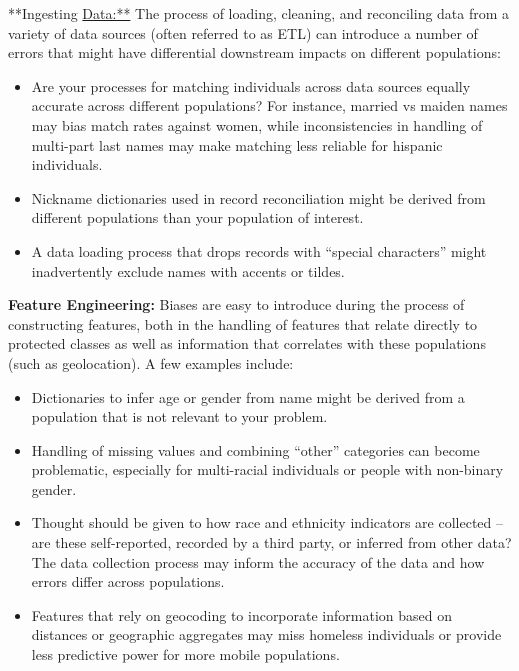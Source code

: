 \documentclass[]{krantz}
\begin{document}
**Ingesting \url{Data:**} The process of loading, cleaning, and
reconciling data from a variety of data sources (often referred to as
ETL) can introduce a number of errors that might have differential
downstream impacts on different populations:

\begin{itemize}
\item
  Are your processes for matching individuals across data sources
  equally accurate across different populations? For instance, married
  vs maiden names may bias match rates against women, while
  inconsistencies in handling of multi-part last names may make matching
  less reliable for hispanic individuals.
\item
  Nickname dictionaries used in record reconciliation might be derived
  from different populations than your population of interest.
\item
  A data loading process that drops records with ``special characters''
  might inadvertently exclude names with accents or tildes.
\end{itemize}

\textbf{Feature Engineering:} Biases are easy to introduce during the
process of constructing features, both in the handling of features that
relate directly to protected classes as well as information that
correlates with these populations (such as geolocation). A few examples
include:

\begin{itemize}
\item
  Dictionaries to infer age or gender from name might be derived from a
  population that is not relevant to your problem.
\item
  Handling of missing values and combining ``other'' categories can
  become problematic, especially for multi-racial individuals or people
  with non-binary gender.
\item
  Thought should be given to how race and ethnicity indicators are
  collected -- are these self-reported, recorded by a third party, or
  inferred from other data? The data collection process may inform the
  accuracy of the data and how errors differ across populations.
\item
  Features that rely on geocoding to incorporate information based on
  distances or geographic aggregates may miss homeless individuals or
  provide less predictive power for more mobile populations.
\end{itemize}
\end{document}

